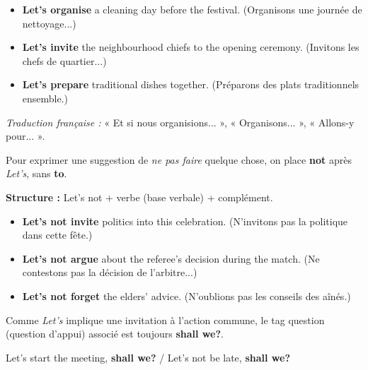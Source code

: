 \documentclass[11pt]{article}
\newcommand{\cle}[1]{{\popxbold\color{popdark}#1}}
\begin{document}
\begin{exemplebox}
\begin{itemize}
    \item \textbf{Let's organise} a cleaning day before the festival. (Organisons une journée de nettoyage...)
    \item \textbf{Let's invite} the neighbourhood chiefs to the opening ceremony. (Invitons les chefs de quartier...)
    \item \textbf{Let's prepare} traditional dishes together. (Préparons des plats traditionnels ensemble.)
\end{itemize}
\emph{Traduction française :} « Et si nous organisions... », « Organisons... », « Allons-y pour... ».
\end{exemplebox}

\begin{definition}
Pour exprimer une suggestion de \emph{ne pas faire} quelque chose, on place \textbf{not} après \emph{Let's}, sans \textbf{to}.
\begin{center}
\textbf{Structure :} Let's not + verbe (base verbale) + complément.
\end{center}
\end{definition}

\begin{exemplebox}
\begin{itemize}
    \item \textbf{Let's not invite} politics into this celebration. (N'invitons pas la politique dans cette fête.)
    \item \textbf{Let's not argue} about the referee's decision during the match. (Ne contestons pas la décision de l'arbitre...)
    \item \textbf{Let's not forget} the elders' advice. (N'oublions pas les conseils des aînés.)
\end{itemize}
\end{exemplebox}

\begin{definition}
Comme \emph{Let's} implique une invitation à l'action commune, le \cle{tag question} (question d'appui) associé est toujours \textbf{shall we?}.
\begin{center}
Let's start the meeting, \textbf{shall we?} / Let's not be late, \textbf{shall we?}
\end{center}
\end{definition}
\end{document}
